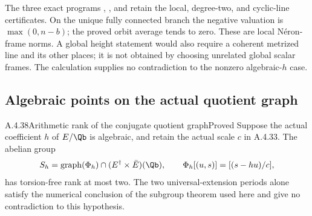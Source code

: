 The three exact programs
,
, and
retain the local, degree-two, and cyclic-line certificates.
On the unique fully connected branch the negative valuation is
$\max(0,n-b)$; the proved orbit average tends to zero.
These are local N\'eron-frame norms. A global height statement would
also require a coherent metrized line and its other places; it is
not obtained by choosing unrelated global scalar frames.
The calculation supplies no contradiction to the nonzero
algebraic-$h$ case.


\subsection{Algebraic points on the actual quotient graph}

\begin{result}{A.4.38}{Arithmetic rank of the conjugate quotient graph}{Proved}
Suppose the actual coefficient $h$ of $E/\Qb$ is algebraic, and
retain the actual scale $c$ in A.4.33. The abelian group
\[
 S_h=\operatorname{graph}(\Phi_h)\cap
                 (E^\dagger\times\bar E)(\Qb),\qquad
 \Phi_h[(u,s)]=[(s-hu)/c],
\]
has torsion-free rank at most two. The two universal-extension
periods alone satisfy the numerical conclusion of the subgroup
theorem used here and give no contradiction to this hypothesis.
\end{result}

